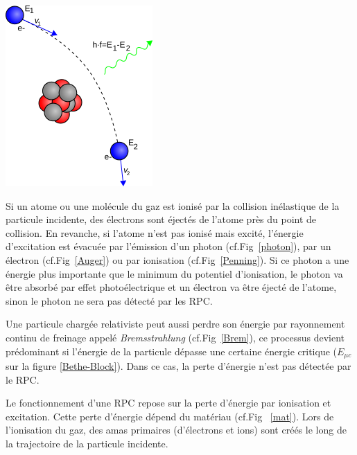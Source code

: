 \marginpar
{
	\centering
	\includegraphics[width=\marginparwidth]{RPC/Brem.png}
	\label{Brem}
}

Si un atome ou une molécule du gaz est ionisé par la collision inélastique de la particule incidente, des électrons sont éjectés de l'atome près du point de collision. En revanche, si l'atome n'est pas ionisé mais excité, l'énergie d'excitation est évacuée par l'émission d'un photon (cf.Fig~\ref{photon}), par un électron  (cf.Fig~\ref{Auger}) ou par ionisation  (cf.Fig~\ref{Penning}). Si ce photon a une énergie plus importante que le minimum du potentiel d'ionisation, le photon va être absorbé par effet photoélectrique et un électron va être éjecté de l'atome, sinon le photon ne sera pas détecté par les RPC.

Une particule chargée relativiste peut aussi perdre son énergie par rayonnement continu de freinage appelé \textit{Bremsstrahlung} (cf.Fig~\ref{Brem}), ce processus devient prédominant si l'énergie de la particule dépasse une certaine énergie critique ($E_{\mu c}$ sur la figure \ref{Bethe-Block}). Dans ce cas, la perte d'énergie n'est pas détectée par le RPC.

Le fonctionnement d'une RPC repose sur la perte d'énergie par ionisation et excitation. Cette perte d'énergie dépend du matériau (cf.Fig~ \ref{mat}). Lors de l'ionisation du gaz, des amas primaires (d'électrons et ions) sont créés le long de la trajectoire de la particule incidente. 


